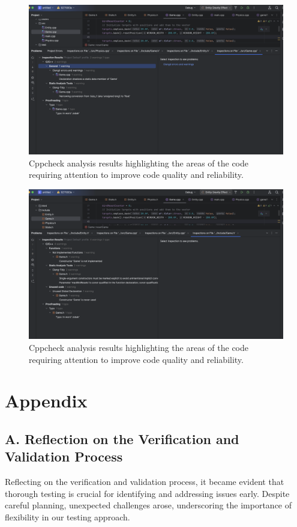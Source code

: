 \documentclass[12pt]{article}
\begin{document}
\begin{figure}[h!]
    \centering
    \includegraphics[width=\linewidth]{cpp3.png}
    \caption{Cppcheck analysis results highlighting the areas of the code requiring attention to improve code quality and reliability.}
    \label{fig:cppcheck_results}
\end{figure}
\FloatBarrier

\begin{figure}[h!]
    \centering
    \includegraphics[width=\linewidth]{cpp4.png}
    \caption{Cppcheck analysis results highlighting the areas of the code requiring attention to improve code quality and reliability.}
    \label{fig:cppcheck_results}
\end{figure}
\FloatBarrier

\newpage
\appendix
\section*{Appendix}

\subsection*{A. Reflection on the Verification and Validation Process}
Reflecting on the verification and validation process, it became evident that thorough testing is crucial for identifying and addressing issues early. Despite careful planning, unexpected challenges arose, underscoring the importance of flexibility in our testing approach.
\end{document}
